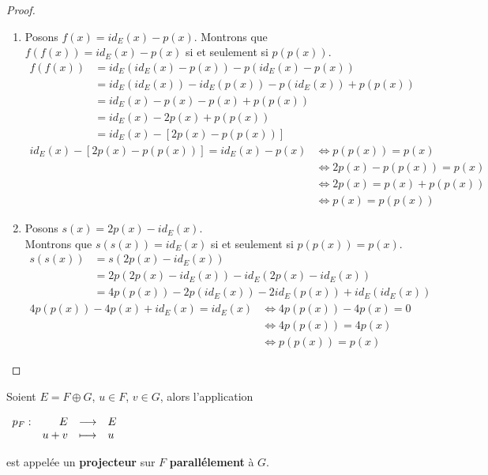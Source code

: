 \begin{proof}
	\leavevmode
    \begin{enumerate}
        \item Posons $f(x) = id_E(x) - p(x)$. Montrons que $f(f(x)) = id_E(x) - p(x)$ si et seulement si $p(p(x))$.
        \begin{align*}
            f(f(x)) &= id_E(id_E(x) - p(x)) - p(id_E(x) - p(x)) \\ 
            &= id_E(id_E(x)) - id_E(p(x)) - p(id_E(x)) + p(p(x)) \\ 
            &= id_E(x) - p(x) - p(x) + p(p(x)) \\ 
            &= id_E(x) - 2p(x) + p(p(x)) \\ 
            &= id_E(x) - [2p(x) - p(p(x))]
        \end{align*}
        \begin{align*}
            id_E(x) - [2p(x) - p(p(x))] = id_E(x) - p(x) &\iff p(p(x)) = p(x) \\ 
            &\iff 2p(x) - p(p(x)) = p(x) \\ 
            &\iff 2p(x) = p(x) + p(p(x)) \\
            &\iff p(x) = p(p(x))
        \end{align*}
        \item Posons $s(x) = 2p(x) - id_E(x)$. 
        \\
        Montrons que $s(s(x)) = id_E(x)$ si et seulement si $p(p(x)) = p(x)$.
        \begin{align*}
            s(s(x)) &= s(2p(x) - id_E(x)) \\
            &= 2p(2p(x) - id_E(x)) - id_E(2p(x) - id_E(x)) \\
            &= 4p(p(x)) - 2p(id_E(x)) - 2id_E(p(x)) + id_E(id_E(x))
        \end{align*}
        \begin{align*}
            4p(p(x)) - 4p(x) + id_E(x) = id_E(x) &\iff 4p(p(x)) - 4p(x) = 0 \\
            &\iff 4p(p(x)) = 4p(x) \\
            &\iff p(p(x)) = p(x)
        \end{align*}
    \end{enumerate}
\end{proof}

\begin{definition}
    Soient $E = F \oplus G$, $u \in F$, $v \in G$, alors l'application 
    \begin{center}
    	$
    	\begin{array}{rrcl} p_F : & E & \longrightarrow & E \\ & u+v & \longmapsto & u \end{array}
    	$
    \end{center}
    est appelée un \textbf{projecteur} sur $F$ \textbf{parallélement} à $G$.
\end{definition}

